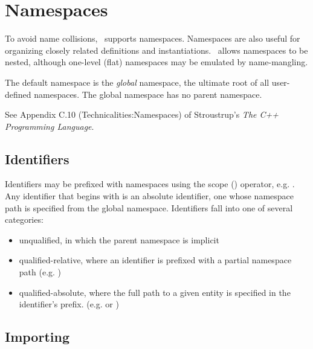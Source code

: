 

\chapter{Namespaces}
\label{sec:namespaces}

To avoid name collisions, \hac\ supports namespaces.  
Namespaces are also useful for organizing closely related definitions
and instantiations.  
\hac\ allows namespaces to be nested, although one-level (flat)
namespaces may be emulated by name-mangling.  

The default namespace is the \emph{global} namespace, 
the ultimate root of all user-defined namespaces.  
The global namespace has no parent namespace.  

See Appendix C.10 (Technicalities:Namespaces) of 
Stroustrup's \textit{The C++ Programming Language}.  

\section{Identifiers}
\label{sec:namespaces:identifiers}

Identifiers may be prefixed with namespaces using the 
scope (\ttt{::}) operator, e.g. .  
Any identifier that begins with \ttt{::} is an absolute identifier, 
one whose namespace path is specified from the global namespace.  
Identifiers fall into one of several categories:

\begin{itemize}
\item unqualified, in which the parent namespace is implicit
\item qualified-relative, where an identifier is prefixed with a
	partial namespace path (e.g. )
\item qualified-absolute, where the full path to a given entity is 
	specified in the identifier's prefix.  
	(e.g.  or )
\end{itemize}


\section{Importing}
\label{sec:namespaces:import}

